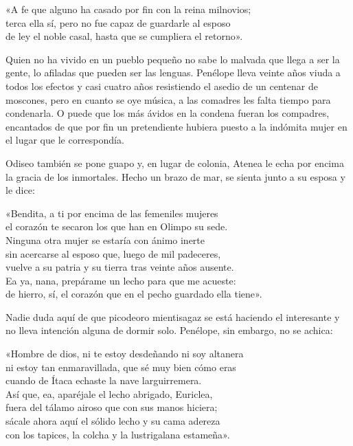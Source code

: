 \begin{versocita}
«A fe que alguno ha casado por fin con la reina milnovios;\\
terca ella sí, pero no fue capaz de guardarle al esposo\\
de ley el noble casal, hasta que se cumpliera el retorno».
\end{versocita}

Quien no ha vivido en un pueblo pequeño no sabe lo malvada que llega a ser la gente, lo afiladas que pueden ser las lenguas. Penélope lleva veinte años viuda a todos los efectos y casi cuatro años resistiendo el asedio de un centenar de moscones, pero en cuanto se oye música, a las comadres les falta tiempo para condenarla. O puede que los más ávidos en la condena fueran los compadres, encantados de que por fin un pretendiente hubiera puesto a la indómita mujer en el lugar que le correspondía.

Odiseo también se pone guapo y, en lugar de colonia, Atenea le echa por encima la gracia de los inmortales. Hecho un brazo de mar, se sienta junto a su esposa y le dice:

\begin{versocita}
«Bendita, a ti por encima de las femeniles mujeres\\
el corazón te secaron los que han en Olimpo su sede.\\
Ninguna otra mujer se estaría con ánimo inerte\\
sin acercarse al esposo que, luego de mil padeceres,\\
vuelve a su patria y su tierra tras veinte años ausente.\\
Ea ya, nana, prepárame un lecho para que me acueste:\\
de hierro, sí, el corazón que en el pecho guardado ella tiene».
\end{versocita}

Nadie duda aquí de que picodeoro mientisagaz se está haciendo el interesante y no lleva intención alguna de dormir solo. Penélope, sin embargo, no se achica:

\begin{versocita}
«Hombre de dios, ni te estoy desdeñando ni soy altanera\\
ni estoy tan enmaravillada, que sé muy bien cómo eras\\
cuando de Ítaca echaste la nave larguirremera.\\
Así que, ea, aparéjale el lecho abrigado, Euriclea,\\
fuera del tálamo airoso que con sus manos hiciera;\\
sácale ahora aquí el sólido lecho y su cama adereza\\
con los tapices, la colcha y la lustrigalana estameña».
\end{versocita}

